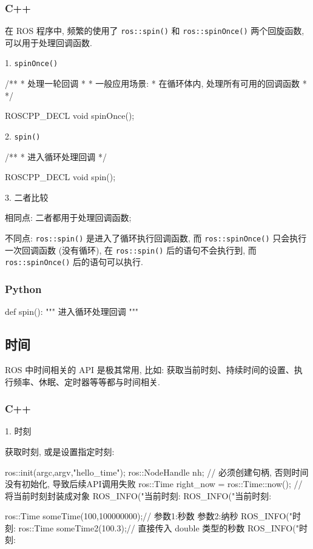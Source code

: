 \documentclass[openany, fontset=windowsold]{ctexbook}
\theoremstyle{kaiti}
\theoremstyle{normal}
\begin{document}
\subsubsection{C++}

在 ROS 程序中, 频繁的使用了 \verb|ros::spin()| 和 \verb|ros::spinOnce()| 两个回旋函数, 可以用于处理回调函数.

1. \verb|spinOnce()|

\begin{cpp}
  /**
   * \brief 处理一轮回调
   *
   * 一般应用场景:
   *     在循环体内, 处理所有可用的回调函数
   * 
   */

  ROSCPP_DECL void spinOnce();
\end{cpp}

2. \verb|spin()|
\begin{cpp}
  /** 
   * \brief 进入循环处理回调 
   */
  
  ROSCPP_DECL void spin();
\end{cpp}

3. 二者比较

相同点: 二者都用于处理回调函数; 

不同点: \verb|ros::spin()| 是进入了循环执行回调函数, 而 \verb|ros::spinOnce()| 只会执行一次回调函数 (没有循环), 在 \verb|ros::spin()| 后的语句不会执行到, 而 \verb|ros::spinOnce()| 后的语句可以执行.

\subsubsection{Python}

\begin{python}
  def spin():
      """
      进入循环处理回调 
      """
\end{python}

\subsection{时间}

ROS 中时间相关的 API 是极其常用, 比如: 获取当前时刻、持续时间的设置、执行频率、休眠、定时器等等都与时间相关.

\subsubsection{C++}

1. 时刻

获取时刻, 或是设置指定时刻:

\begin{cpp}
  ros::init(argc,argv,"hello_time");
  ros::NodeHandle nh; // 必须创建句柄, 否则时间没有初始化, 导致后续API调用失败
  ros::Time right_now = ros::Time::now(); // 将当前时刻封装成对象
  ROS_INFO("当前时刻:%
  ROS_INFO("当前时刻:%

  ros::Time someTime(100,100000000);// 参数1:秒数  参数2:纳秒
  ROS_INFO("时刻:%
  ros::Time someTime2(100.3);// 直接传入 double 类型的秒数
  ROS_INFO("时刻:%
\end{cpp}
\end{document}

